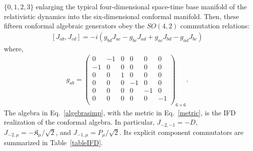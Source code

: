 \documentclass[foundations,article,submit,pdftex,moreauthors]{Definitions/mdpi}
\begin{document}
$\{0,1,2,3\}$ enlarging the typical four-dimensional space-time base manifold of the relativistic dynamics into the six-dimensional conformal manifold. Then, these fifteen conformal algebraic generators 
obey the $SO(4,2)$ commutation relations:
  \begin{align}\label{algebrasimp}
      \left[J_{{a}{b}},J_{{c}{d}}\right]=-i\left(g_{{b}{d}}J_{{a}{c}}-g_{{b}{c}}J_{{a}{d}}+g_{{a}{c}}J_{{b}{d}}-g_{{a}{d}}J_{{b}{c}}\right) 
  \end{align}
where, 
  \begin{align}\label{metric}
      g_{ab}=\begin{pmatrix}
  0&-1&0&0&0&0\\
  -1&0&0&0&0&0\\
  0&0&1&0&0&0\\
  0&0&0&-1&0&0\\
  0&0&0&0&-1&0\\
  0&0&0&0&0&-1\\
  \end{pmatrix}_{6\times6} .
  \end{align}
%
The algebra in Eq.~\eqref{algebrasimp}, with the metric in Eq.~\eqref{metric}, is the IFD realization of the conformal algebra. In particular,
$J_{-2,-1}=-D$, $J_{-2,\mu}=-\mathfrak{K}_{\mu}/\sqrt{2}$, and
$J_{-1,\mu}=P_{\mu}/\sqrt{2}$. Its explicit component commutators are summarized in Table~\ref{tableIFD}. \\
\end{document}
